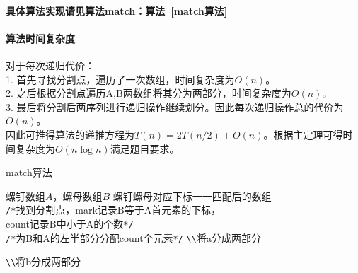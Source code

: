 \documentclass[11pt]{ctexart}
\begin{document}
	\paragraph{具体算法实现请见算法match：算法~\ref{match算法}}
	\paragraph{算法时间复杂度}对于每次递归代价：\\
	\hspace*{20pt}1. 首先寻找分割点，遍历了一次数组，时间复杂度为$O(n)$。\\
	\hspace*{20pt}2. 之后根据分割点遍历A,B两数组将其分为两部分，时间复杂度为$O(n)$。\\
	\hspace*{20pt}3. 最后将分割后两序列进行递归操作继续划分。因此每次递归操作总的代价为$O(n)$。\\
	\hspace*{20pt}因此可推得算法的递推方程为$T(n)=2T(n/2)+O(n)$。根据主定理可得时间复杂度为$O(n\log n)$满足题目要求。
	\begin{algorithm}
		\caption{match算法}
		\label{match算法}
		\begin{algorithmic}[1]
			\Require 螺钉数组$A$，螺母数组$B$
			\Ensure 螺钉螺母对应下标一一匹配后的数组
			\\
			\verb|/*|找到分割点，mark记录B等于A首元素的下标，\\
			count记录B中小于A的个数\verb|*/|
			\EndFor\\
			\verb|/*|为B和A的左半部分分配count个元素\verb|*/|
			\verb|\\|将a分成两部分
			\EndWhile
			\EndWhile
			\EndWhile
			
			\verb|\\|将b分成两部分
			\EndWhile
			\EndWhile
			\EndWhile
			\EndFunction
		\end{algorithmic}
	\end{algorithm}
	\newpage
\end{document}
